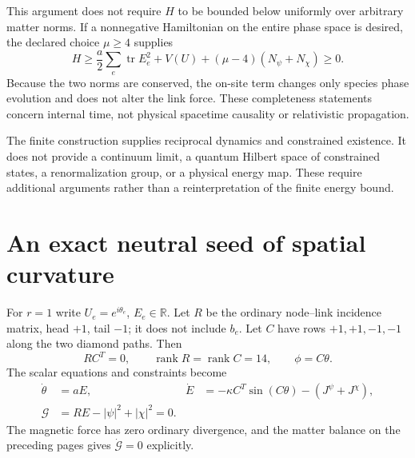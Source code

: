 \documentclass[11pt,a4paper]{article}
\newcommand{\tr}{\operatorname{tr}}\newcommand{\Rea}{\operatorname{Re}}\newcommand{\Ima}{\operatorname{Im}}
\begin{document}
This argument does not require $H$ to be bounded below uniformly over arbitrary matter norms. If a nonnegative Hamiltonian on the entire phase space is desired, the declared choice $\mu\geq4$ supplies
\[
H\geq\frac a2\sum_e\tr E_e^2+V(U)+(\mu-4)(N_\psi+N_\chi)\geq0.
\]
Because the two norms are conserved, the on-site term changes only species phase evolution and does not alter the link force. These completeness statements concern internal time, not physical spacetime causality or relativistic propagation.

The finite construction supplies reciprocal dynamics and constrained existence. It does not provide a continuum limit, a quantum Hilbert space of constrained states, a renormalization group, or a physical energy map. These require additional arguments rather than a reinterpretation of the finite energy bound.

\newpage
\section{An exact neutral seed of spatial curvature}
For $r=1$ write $U_e=e^{i\theta_e}$, $E_e\in\mathbb R$. Let $R$ be the ordinary node--link incidence matrix, head $+1$, tail $-1$; it does not include $b_e$. Let $C$ have rows $+1,+1,-1,-1$ along the two diamond paths. Then
\[
RC^T=0,\qquad \operatorname{rank}R=\operatorname{rank}C=14,
\qquad \phi=C\theta.
\]
The scalar equations and constraints become
\begin{align}
\dot\theta&=aE,&\dot E&=-\kappa C^T\sin(C\theta)-(J^\psi+J^\chi),\\
\mathcal G&=RE-|\psi|^2+|\chi|^2=0.
\end{align}
The magnetic force has zero ordinary divergence, and the matter balance on the preceding pages gives $\dot{\mathcal G}=0$ explicitly.
\end{document}
